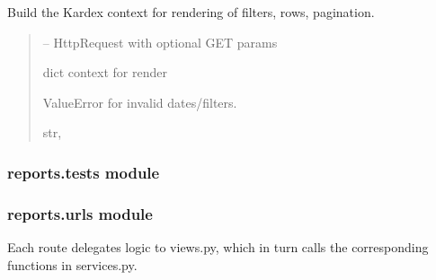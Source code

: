\documentclass[a4paper,11pt,spanish]{sphinxmanual}
\begin{document}

\begin{fulllineitems}
\label{\detokenize{api/reports/reports.services:reports.services.get_kardex_context}}
\pysigstartsignatures
\pysiglinewithargsret
{}
{}
{}
\pysigstopsignatures
\sphinxAtStartPar
Build the Kardex context for rendering of filters, rows, pagination.
\begin{quote}\begin{description}
\sphinxAtStartPar
{} – HttpRequest with optional GET params

\sphinxAtStartPar
dict context for render

\sphinxAtStartPar
ValueError for invalid dates/filters.

\sphinxAtStartPar
\sphinxstyleemphasis{Dict}{[}str, \sphinxstyleemphasis{Any}{]}

\end{description}\end{quote}

\end{fulllineitems}


\sphinxstepscope


\subsubsection{reports.tests module}
\label{\detokenize{api/reports/reports.tests:module-reports.tests}}\label{\detokenize{api/reports/reports.tests:reports-tests-module}}\label{\detokenize{api/reports/reports.tests::doc}}
\sphinxstepscope


\subsubsection{reports.urls module}
\label{\detokenize{api/reports/reports.urls:module-reports.urls}}\label{\detokenize{api/reports/reports.urls:reports-urls-module}}\label{\detokenize{api/reports/reports.urls::doc}}
\sphinxAtStartPar
Each route delegates logic to views.py, which in turn calls the corresponding
functions in services.py.
\end{document}
